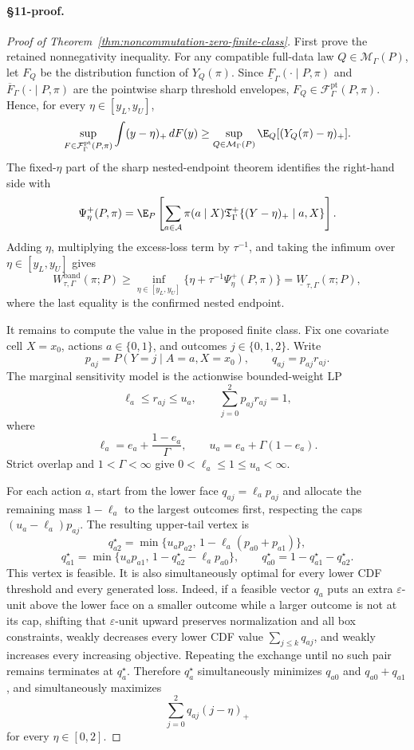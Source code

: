 \paragraph{\S11-proof.}
\begin{proof}[Proof of Theorem~\ref{thm:noncommutation-zero-finite-class}]
First prove the retained nonnegativity inequality.  For any compatible full-data law
\(Q\in\mathcal M_\Gamma(P)\), let \(F_Q\) be the distribution function of \(Y_Q(\pi)\).  Since
\(\underline F_\Gamma(\cdot\mid P,\pi)\) and \(\overline F_\Gamma(\cdot\mid P,\pi)\) are the
pointwise sharp threshold envelopes, \(F_Q\in\mathcal F_\Gamma^{\mathrm{pt}}(P,\pi)\).  Hence, for
every \(\eta\in[y_L,y_U]\),
\[
\sup_{F\in\mathcal F_\Gamma^{\mathrm{pt}}(P,\pi)}
\int (y-\eta)_+\,dF(y)
\ge
\sup_{Q\in\mathcal M_\Gamma(P)}
\E_Q[(Y_Q(\pi)-\eta)_+].
\]
The fixed-\(\eta\) part of the sharp nested-endpoint theorem identifies the right-hand side with
\[
\Psi_\eta^+(P,\pi)
=
\E_P\left[
\sum_{a\in\mathcal A}\pi(a\mid X)
\mathfrak T_\Gamma^+\{(Y-\eta)_+\mid a,X\}
\right].
\]
Adding \(\eta\), multiplying the excess-loss term by \(\tau^{-1}\), and taking the infimum over
\(\eta\in[y_L,y_U]\) gives
\[
W_{\tau,\Gamma}^{\mathrm{band}}(\pi;P)
\ge
\inf_{\eta\in[y_L,y_U]}
\{\eta+\tau^{-1}\Psi_\eta^+(P,\pi)\}
=
\underline W_{\tau,\Gamma}(\pi;P),
\]
where the last equality is the confirmed nested endpoint.

It remains to compute the value in the proposed finite class.  Fix one covariate cell
\(X=x_0\), actions \(a\in\{0,1\}\), and outcomes \(j\in\{0,1,2\}\).  Write
\[
p_{aj}=P(Y=j\mid A=a,X=x_0),\qquad
q_{aj}=p_{aj}r_{aj}.
\]
The marginal sensitivity model is the actionwise bounded-weight LP
\[
\ell_a\le r_{aj}\le u_a,\qquad
\sum_{j=0}^2 p_{aj}r_{aj}=1,
\]
where
\[
\ell_a=e_a+\frac{1-e_a}{\Gamma},
\qquad
u_a=e_a+\Gamma(1-e_a).
\]
Strict overlap and \(1<\Gamma<\infty\) give \(0<\ell_a\le1\le u_a<\infty\).

For each action \(a\), start from the lower face \(q_{aj}=\ell_a p_{aj}\) and allocate the remaining
mass \(1-\ell_a\) to the largest outcomes first, respecting the caps
\((u_a-\ell_a)p_{aj}\).  The resulting upper-tail vertex is
\[
q^\star_{a2}=\min\{u_ap_{a2},\,1-\ell_a(p_{a0}+p_{a1})\},
\]
\[
q^\star_{a1}=\min\{u_ap_{a1},\,1-q^\star_{a2}-\ell_ap_{a0}\},
\qquad
q^\star_{a0}=1-q^\star_{a1}-q^\star_{a2}.
\]
This vertex is feasible.  It is also simultaneously optimal for every lower CDF threshold and every
generated loss.  Indeed, if a feasible vector \(q_a\) puts an extra \(\varepsilon\)-unit above the
lower face on a smaller outcome while a larger outcome is not at its cap, shifting that
\(\varepsilon\)-unit upward preserves normalization and all box constraints, weakly decreases every
lower CDF value \(\sum_{j\le k}q_{aj}\), and weakly increases every increasing objective.  Repeating
the exchange until no such pair remains terminates at \(q_a^\star\).  Therefore \(q_a^\star\)
simultaneously minimizes \(q_{a0}\) and \(q_{a0}+q_{a1}\), and simultaneously maximizes
\[
\sum_{j=0}^2 q_{aj}(j-\eta)_+
\]
for every \(\eta\in[0,2]\).


\end{proof}
